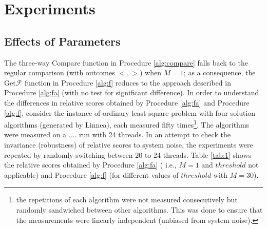 \documentclass[conference]{IEEEtran}
\begin{document}
\section{Experiments}
\label{sec:exp}

\subsection{Effects of Parameters}
 The three-way Compare function in Procedure \ref{alg:compare} falls back to the regular comparison (with outcomes $< , >$) when $M = 1$; as a consequence, the Get$\mathcal{F}$ function in Procedure \ref{alg:f} reduces to the approach described in Procedure \ref{alg:fa} (with no test for significant difference). In order to understand the differences in relative scores obtained by Procedure \ref{alg:fa} and Procedure \ref{alg:f}, consider the instance of ordinary least square problem with four solution algorithms (generated by Linnea\cite{barthels2019linnea}), each measured fifty times\footnote{the repetitions of each algorithm were not measured consecutively but randomly sandwiched between other algorithms. This was done to ensure that the measurements were linearly independent (unbiased from system noise).}. The algorithms were measured on a  .... run with 24 threads.  In an attempt  to check the invariance (robustness) of relative scores to system noise, the experiments were repeated by randomly switching between 20 to 24 threads. Table \ref{tab:1} shows the relative scores obtained by Procedure \ref{alg:fa} ( i.e., $M=1$  and $threshold$ not applicable) and Procedure \ref{alg:f} (for different values of $threshold$ with $M=30$). 
\end{document}

